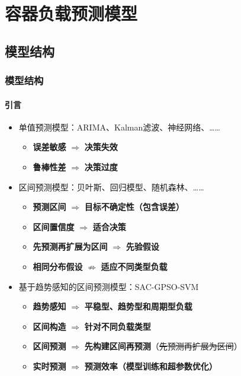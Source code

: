 \section{容器负载预测模型}

\subsection{模型结构}

\begin{frame}
\frametitle{模型结构}
\framesubtitle{引言}
\begin{itemize}
    \item 单值预测模型：ARIMA、Kalman滤波、神经网络、……
    \begin{itemize}
        \item \textbf{误差敏感} $\Rightarrow$ \textbf{决策失效}
        \item \textbf{鲁棒性差} $\Rightarrow$ \textbf{决策过度}
    \end{itemize}
    \item 区间预测模型：贝叶斯、回归模型、随机森林、……
    \begin{itemize}
        \item \textbf{预测区间} $\Rightarrow$ \textbf{目标不确定性（包含误差）}
        \item \textbf{区间置信度} $\Rightarrow$ \textbf{适合决策}
        \item \alert{\textbf{先预测再扩展为区间} $\Rightarrow$ \textbf{先验假设}}
        \item \alert{\textbf{相同分布假设} $\nRightarrow$ \textbf{适应不同类型负载}}
    \end{itemize}
    \item 基于趋势感知的区间预测模型：SAC-GPSO-SVM
    \begin{itemize}
        \item \textbf{趋势感知} $\Rightarrow$ \textbf{平稳型、趋势型和周期型负载}
        \item \textbf{区间构造} $\Rightarrow$ \textbf{针对不同负载类型}
        \item \textbf{区间预测} $\Rightarrow$ \textbf{先构建区间再预测}（\sout{先预测再扩展为区间}）
        \item \textbf{实时预测} $\Rightarrow$ \textbf{预测效率（模型训练和超参数优化）}
    \end{itemize}
\end{itemize}
\end{frame}

